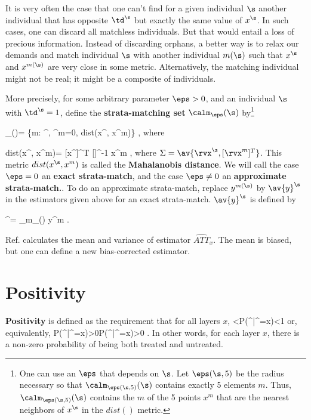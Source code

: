 It is very often
the case that
one can't
find for a given
individual $\s$
another individual that has
opposite $\td^\s$ but
exactly the same value of $x^\s$.
In such cases, one can discard all
matchless individuals.
But that would entail a loss
of precious information.
Instead of discarding orphans,
a better way is to
relax our demands and
match individual $\s$
with another individual $m(\s)$
such that $x^\s$
and $x^{m(\s)}$ are very
close in some metric.
Alternatively, the matching
individual might
not be real; it might
be a composite
of individuals.

More precisely,
for some arbitrary
parameter $\eps>0$,
and an individual $\s$
with $\td^\s=1$,
define
the {\bf strata-matching set}
$\calm_{\eps}(\s)$ by\footnote{
One can use an $\eps$
that depends on $\s$.
Let $\eps(\s, 5)$
be the radius necessary
so that $\calm_{\eps(\s, 5)}(\s)$
contains exactly 5 elements $m$.
Thus, $\calm_{\eps(\s, 5)}(\s)$
contains the $m$ of the
 5 points $x^m$ that are the
nearest neighbors of $x^\s$
in the $dist()$ metric.}

\beq
\calm_{\eps}(\s)=
\{m: \td^, \td^m=0,
dist(x^\s, x^m)\leq \eps \}
\;,
\eeq
where

\beq
dist(x^\s, x^m)=
[x^\s]^T [\Sigma]^{-1} x^m
\;,
\eeq
where $\Sigma = \av{\rvx^\s, [\rvx^m]^T}$.
 This
metric $dist(x^\s, x^m)$ is
called the {\bf Mahalanobis distance}.
We will call
the case $\eps=0$ an {\bf  exact strata-match},
and
the case
$\eps\neq 0$
 an {\bf approximate strata-match.}.
To do an approximate strata-match,
replace $y^{m(\s)}$
by
$\av{y}^\s$
in
the estimators
given above
for an exact strata-match.
$\av{y}^\s$
is defined by

\beq
{}^\s=
\sum_{m\in \calm_{\eps}(\s)}
y^m
\;.
\eeq

Ref.\cite{book-mixtape}
calculates the mean and variance
of estimator $\widehat{ATT}_x$.
The mean is biased,
but one can define a new
bias-corrected estimator.


\section{Positivity}


{\bf Positivity} is defined as the
requirement that for all layers $x$,
<P(\rvd^|\rvx^\s=x)<1
\eeq
or, equivalently,
\beq
P(\rvd^|\rvx^\s=x)>0P(\rvd^|\rvx^\s=x)>0
\;.
\eeq
In other words,
for each layer $x$,
there is
a non-zero
probability of being both treated
and untreated.

